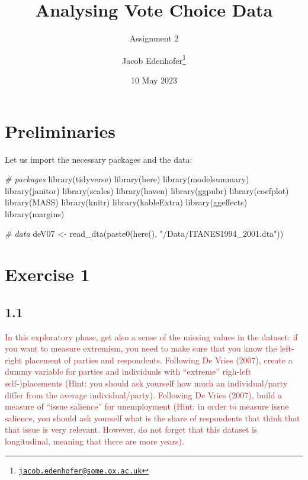 \documentclass[
]{article}
\title{Analysing Vote Choice Data}
\subtitle{Assignment 2}
\author{Jacob Edenhofer\footnote{\href{mailto:jacob.edenhofer@some.ox.ac.uk}{\nolinkurl{jacob.edenhofer@some.ox.ac.uk}}}}
\date{10 May 2023}
\newenvironment{Shaded}{\begin{snugshade}}{\end{snugshade}}
\newcommand{\CommentTok}[1]{\textcolor[rgb]{0.56,0.35,0.01}{\textit{#1}}}
\newcommand{\FunctionTok}[1]{\textcolor[rgb]{0.00,0.00,0.00}{#1}}
\newcommand{\NormalTok}[1]{#1}
\newcommand{\OtherTok}[1]{\textcolor[rgb]{0.56,0.35,0.01}{#1}}
\newcommand{\StringTok}[1]{\textcolor[rgb]{0.31,0.60,0.02}{#1}}
\begin{document}
\maketitle

\hypertarget{preliminaries}{%
\section{Preliminaries}\label{preliminaries}}

Let us import the necessary packages and the data:

\begin{Shaded}
\begin{Highlighting}[]
\CommentTok{\# packages }
\FunctionTok{library}\NormalTok{(tidyverse)}
\FunctionTok{library}\NormalTok{(here)}
\FunctionTok{library}\NormalTok{(modelsummary)}
\FunctionTok{library}\NormalTok{(janitor)}
\FunctionTok{library}\NormalTok{(scales)}
\FunctionTok{library}\NormalTok{(haven)}
\FunctionTok{library}\NormalTok{(ggpubr)}
\FunctionTok{library}\NormalTok{(coefplot)}
\FunctionTok{library}\NormalTok{(MASS)}
\FunctionTok{library}\NormalTok{(knitr)}
\FunctionTok{library}\NormalTok{(kableExtra)}
\FunctionTok{library}\NormalTok{(ggeffects)}
\FunctionTok{library}\NormalTok{(margins)}

\CommentTok{\# data}
\NormalTok{deV07 }\OtherTok{\textless{}{-}} \FunctionTok{read\_dta}\NormalTok{(}\FunctionTok{paste0}\NormalTok{(}\FunctionTok{here}\NormalTok{(), }\StringTok{"/Data/ITANES1994\_2001.dta"}\NormalTok{))}
\end{Highlighting}
\end{Shaded}

\hypertarget{exercise-1}{%
\section{Exercise 1}\label{exercise-1}}

\hypertarget{section}{%
\subsection{1.1}\label{section}}

\textcolor{brown}{In this exploratory phase, get also a sense of the missing values in the dataset: if you want to measure extremism, you need to make sure that you know the left-right placement of parties and respondents. Following De Vries (2007), create a dummy variable for parties and individuals with “extreme” righ-left self-)placements (Hint: you should ask yourself how much an individual/party differ from the average individual/party). Following De Vries (2007), build a measure of “issue salience” for unemployment (Hint: in order to measure issue salience, you should ask yourself what is the share of respondents that think that that issue is very relevant. However, do not forget that this dataset is longitudinal, meaning that there are more years).}
\end{document}
